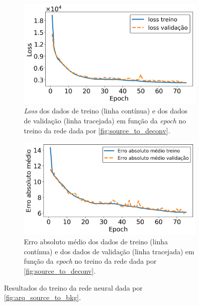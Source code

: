 \documentclass[a4paper,12pt,oneside]{book}
\begin{document}
\begin{figure}[H]
\centering
    \begin{subfigure}[t]{0.49\textwidth}
        \centering
        \includegraphics[scale=0.42]{figs/source_wo_bkg_to_deconv_loss.png}
        \caption{\textit{Loss} dos dados de treino (linha contínua) e dos dados de validação (linha tracejada) em função da \textit{epoch} no treino da rede dada por \ref{fig:source_to_deconv}.}
        \label{subfig:source_wo_bkg_to_deconv_loss}
    \end{subfigure}%
    \hfill
    \begin{subfigure}[t]{0.465\textwidth}
        \centering
        \includegraphics[scale=0.42]{figs/source_wo_bkg_to_deconv_metric.png}
        \caption{Erro absoluto médio dos dados de treino (linha contínua) e dos dados de validação (linha tracejada) em função da \textit{epoch} no treino da rede dada por \ref{fig:source_to_deconv}.}
        \label{subfig:source_wo_bkg_to_deconv_metric}
    \end{subfigure}
\caption{Resultados do treino da rede neural dada por \ref{fig:arq_source_to_bkg}.}
\label{fig:source_wo_bkg_to_deconv_results}
\end{figure}
\end{document}

